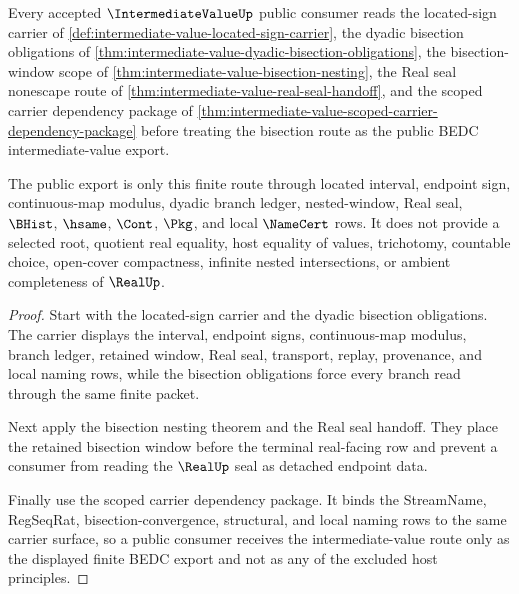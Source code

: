\begin{theorem}
\label{thm:intermediate-value-public-export-route}
Every accepted $\IntermediateValueUp$ public consumer reads the located-sign carrier of \autoref{def:intermediate-value-located-sign-carrier}, the dyadic bisection obligations of \autoref{thm:intermediate-value-dyadic-bisection-obligations}, the bisection-window scope of \autoref{thm:intermediate-value-bisection-nesting}, the Real seal nonescape route of \autoref{thm:intermediate-value-real-seal-handoff}, and the scoped carrier dependency package of \autoref{thm:intermediate-value-scoped-carrier-dependency-package} before treating the bisection route as the public BEDC intermediate-value export.

The public export is only this finite route through located interval, endpoint sign, continuous-map modulus, dyadic branch ledger, nested-window, Real seal, $\BHist$, $\hsame$, $\Cont$, $\Pkg$, and local $\NameCert$ rows. It does not provide a selected root, quotient real equality, host equality of values, trichotomy, countable choice, open-cover compactness, infinite nested intersections, or ambient completeness of $\RealUp$.
\end{theorem}
\begin{proof}
Start with the located-sign carrier and the dyadic bisection obligations. The carrier displays the interval, endpoint signs, continuous-map modulus, branch ledger, retained window, Real seal, transport, replay, provenance, and local naming rows, while the bisection obligations force every branch read through the same finite packet.

Next apply the bisection nesting theorem and the Real seal handoff. They place the retained bisection window before the terminal real-facing row and prevent a consumer from reading the $\RealUp$ seal as detached endpoint data.

Finally use the scoped carrier dependency package. It binds the StreamName, RegSeqRat, bisection-convergence, structural, and local naming rows to the same carrier surface, so a public consumer receives the intermediate-value route only as the displayed finite BEDC export and not as any of the excluded host principles.
\end{proof}

